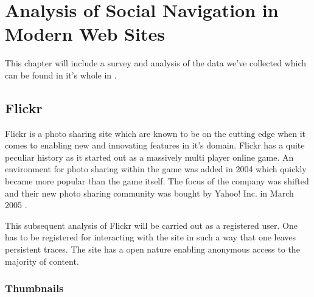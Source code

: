 \chapter{Analysis of Social Navigation in Modern Web Sites}
\label{chapter:analysis}

This chapter will include a survey and analysis of the data we've collected
which can be found in it's whole in
.

\section{Flickr}


Flickr is a photo sharing site which are known to be on the cutting edge when
it comes to enabling new and innovating features in it's domain. Flickr has a
quite peculiar history as it started out as a massively multi player online
game. An environment for photo sharing within the game was added in 2004 which
quickly became more popular than the game itself. The focus of the company was
shifted and their new photo sharing community was bought by Yahoo! Inc. in
March 2005 \citep[p.~257]{livingston07}.

This subsequent
analysis of Flickr will be carried out as a registered user. One has to be
registered for interacting with the site in such a way that one leaves
persistent traces. The site has a open nature enabling anonymous access
to the majority of content.

\subsection{Thumbnails}

